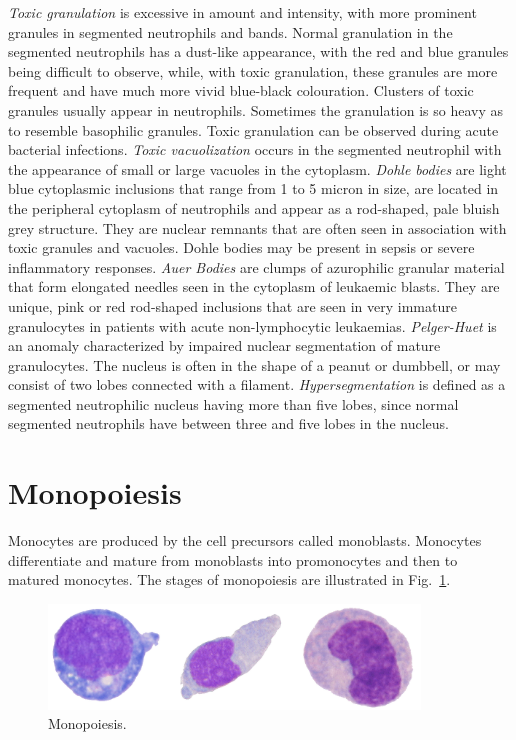 \documentclass[final,a4paper,12pt,english]{UnicaPhdThesis3}
\begin{document}
\textit{Toxic granulation} is excessive in amount and intensity, with more prominent granules in segmented neutrophils and bands. Normal granulation in the segmented neutrophils has a dust-like appearance, with the red and blue granules being difficult to observe, while, with toxic granulation, these granules are more frequent and have much more vivid blue-black colouration. Clusters of toxic granules usually appear in neutrophils. Sometimes the granulation is so heavy as to resemble basophilic granules. Toxic granulation can be observed during acute bacterial infections. \textit{Toxic vacuolization} occurs in the segmented neutrophil with the appearance of small or large vacuoles in the cytoplasm. \textit{Dohle bodies} are light blue cytoplasmic inclusions that range from 1 to 5 micron in size, are located in the peripheral cytoplasm of neutrophils and appear as a rod-shaped, pale bluish grey structure. They are nuclear remnants that are often seen in association with toxic granules and vacuoles. Dohle bodies may be present in sepsis or severe inflammatory responses. \textit{Auer Bodies} are clumps of azurophilic granular material that form elongated needles seen in the cytoplasm of leukaemic blasts. They are unique, pink or red rod-shaped inclusions that are seen in very immature granulocytes in patients with acute non-lymphocytic leukaemias. \textit{Pelger-Huet} is an anomaly characterized by impaired nuclear segmentation of mature granulocytes. The nucleus is often in the shape of a peanut or dumbbell, or may consist of two lobes connected with a filament. \textit{Hypersegmentation} is defined as a segmented neutrophilic nucleus having more than five lobes, since normal segmented neutrophils have between three and five lobes in the nucleus. 

\section{Monopoiesis}
Monocytes are produced by the cell precursors called monoblasts. Monocytes differentiate and mature from monoblasts into promonocytes and then to matured monocytes. The stages of monopoiesis are illustrated in Fig.~\ref{fig:Monopoiesis}.

\begin{figure}[!htbp]
\centering
\includegraphics[width=0.88\textwidth]{images/monopoiesis}
\caption{\label{fig:Monopoiesis} Monopoiesis.}
\end{figure}
\end{document}
